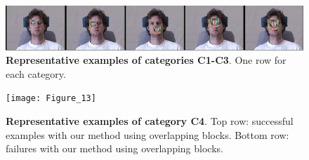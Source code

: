 \documentclass[10pt,journal,letterpaper,compsoc]{IEEEtran}
\begin{document}
\begin{figure}
\centering
\includegraphics{Figure_12}
\caption{{\bf Representative examples of categories C1-C3}. One row for each category.}\label{fig:examples1-3}
\vspace{-.1in}
\end{figure}

\begin{figure}[t]
\centering
\texttt{[image: Figure\_13]}
\caption{{\bf Representative examples of category C4}. Top row: successful examples with our method using overlapping blocks. Bottom row: failures with our method using overlapping blocks.}\label{fig:examples4}
\vspace{-.55in}
\end{figure}
\end{document}
